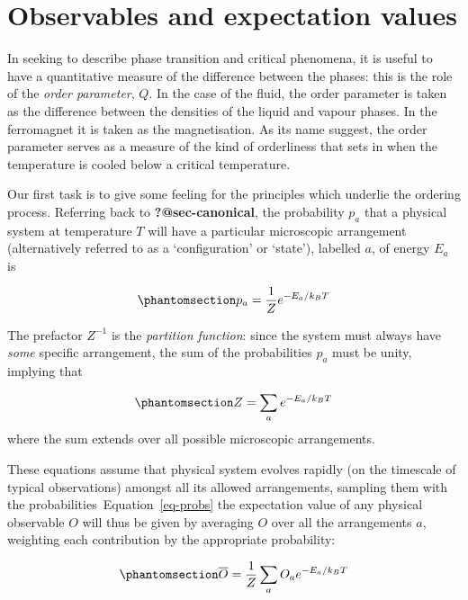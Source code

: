 \documentclass[
  letterpaper,
  enabledeprecatedfontcommands]{report}
\begin{document}
\section{Observables and expectation
values}\label{observables-and-expectation-values}

In seeking to describe phase transition and critical phenomena, it is
useful to have a quantitative measure of the difference between the
phases: this is the role of the \emph{order parameter}, \(Q\). In the
case of the fluid, the order parameter is taken as the difference
between the densities of the liquid and vapour phases. In the
ferromagnet it is taken as the magnetisation. As its name suggest, the
order parameter serves as a measure of the kind of orderliness that sets
in when the temperature is cooled below a critical temperature.

Our first task is to give some feeling for the principles which underlie
the ordering process. Referring back to \textbf{?@sec-canonical}, the
probability \(p_a\) that a physical system at temperature \(T\) will
have a particular microscopic arrangement (alternatively referred to as
a `configuration' or `state'), labelled \(a\), of energy \(E_a\) is

\begin{equation}\phantomsection\label{eq-probs}{
p_a=\frac{1}{Z}e^{-E_a/k_BT}
}\end{equation}

The prefactor \(Z^{-1}\) is the \emph{partition function}: since the
system must always have \emph{some} specific arrangement, the sum of the
probabilities \(p_a\) must be unity, implying that

\begin{equation}\phantomsection\label{eq-partition}{
Z=\sum_ae^{-E_a/k_BT}
}\end{equation} where the sum extends over all possible microscopic
arrangements.

These equations assume that physical system evolves rapidly (on the
timescale of typical observations) amongst all its allowed arrangements,
sampling them with the probabilities~Equation~\ref{eq-probs} the
expectation value of any physical observable \(O\) will thus be given by
averaging \(O\) over all the arrangements \(a\), weighting each
contribution by the appropriate probability:

\begin{equation}\phantomsection\label{eq-observable}{\overline {O}=\frac{1}{Z}\sum_a O_a e^{-E_a/k_BT}
}\end{equation}
\end{document}
